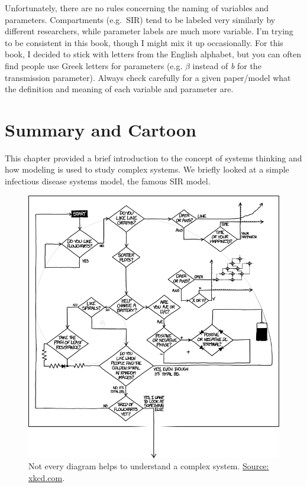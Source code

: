 \documentclass[]{book}
\theoremstyle{definition}
\theoremstyle{definition}
\theoremstyle{definition}
\theoremstyle{remark}
\begin{document}
Unfortunately, there are no rules concerning the naming of variables and
parameters. Compartments (e.g.~SIR) tend to be labeled very similarly by
different researchers, while parameter labels are much more variable.
I'm trying to be consistent in this book, though I might mix it up
occasionally. For this book, I decided to stick with letters from the
English alphabet, but you can often find people use Greek letters for
parameters (e.g. \(\beta\) instead of \emph{b} for the transmission
parameter). Always check carefully for a given paper/model what the
definition and meaning of each variable and parameter are.

\section{Summary and Cartoon}\label{summary-and-cartoon}

This chapter provided a brief introduction to the concept of systems
thinking and how modeling is used to study complex systems. We briefly
looked at a simple infectious disease systems model, the famous SIR
model.

\begin{figure}
\centering
\includegraphics{./images/xkcd-flowcharts.png}
\caption{\label{fig:complexcartoon}Not every diagram helps to understand a
complex system. \href{https://xkcd.com/1488/}{Source: xkcd.com}.}
\end{figure}
\end{document}
